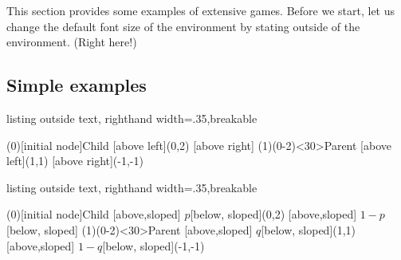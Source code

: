 This section provides some examples of extensive games.
Before we start, let us change the default font size of the  environment by stating
\cmd{\setistgamefontsize\{\cmd{\footnotesize\}}} outside of the environment. (Right here!)

\setistgamefontsize{\footnotesize}

\subsection{Simple examples}

\begin{tcblisting}{listing outside text, righthand width=.35\linewidth,breakable}
\begin{istgame}[->,shorten >=1.3pt]
\xtdistance{15mm}{30mm}
\istroot(0)[initial node]{Child}
  [above left]{(0,2)}
  [above right]
  \endist
\istroot(1)(0-2)<30>{Parent}
  [above left]{(1,1)}
  [above right]{(-1,-1)}
  \endist 
\end{istgame}
\end{tcblisting}

\medskip 

%

\begin{tcblisting}{listing outside text, righthand width=.35\linewidth,breakable}
\begin{istgame}
\xtShowArrows
\xtdistance{15mm}{30mm}
\istroot(0)[initial node]{Child}
  [above,sloped]
       {$p$}[below, sloped]{(0,2)}
  [above,sloped]
       {$1-p$}[below, sloped]
  \endist
\istroot(1)(0-2)<30>{Parent}
  [above,sloped]
       {$q$}[below, sloped]{(1,1)}
  [above,sloped]
       {$1-q$}[below, sloped]{(-1,-1)}
  \endist 
\end{istgame}
\end{tcblisting}


